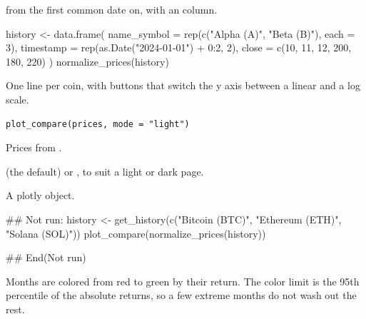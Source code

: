 \documentclass[a4paper]{book}
\begin{document}
%
\begin{Value}
 from the first common date on, with an  column.
\end{Value}
%
\begin{Examples}
\begin{ExampleCode}
history <- data.frame(
  name_symbol = rep(c("Alpha (A)", "Beta (B)"), each = 3),
  timestamp = rep(as.Date("2024-01-01") + 0:2, 2),
  close = c(10, 11, 12, 200, 180, 220)
)
normalize_prices(history)
\end{ExampleCode}
\end{Examples}
%
\begin{Description}
One line per coin, with buttons that switch the y axis between a linear
and a log scale.
\end{Description}
%
\begin{Usage}
\begin{verbatim}
plot_compare(prices, mode = "light")
\end{verbatim}
\end{Usage}
%
\begin{Arguments}
\begin{ldescription}
\item[\code{prices}] Prices from .

\item[\code{mode}]  (the default) or , to suit a light or dark
page.
\end{ldescription}
\end{Arguments}
%
\begin{Value}
A plotly object.
\end{Value}
%
\begin{Examples}
\begin{ExampleCode}
## Not run: 
history <- get_history(c("Bitcoin (BTC)", "Ethereum (ETH)", "Solana (SOL)"))
plot_compare(normalize_prices(history))

## End(Not run)
\end{ExampleCode}
\end{Examples}
%
\begin{Description}
Months are colored from red to green by their return. The color limit is
the 95th percentile of the absolute returns, so a few extreme months do
not wash out the rest.
\end{Description}
\end{document}
